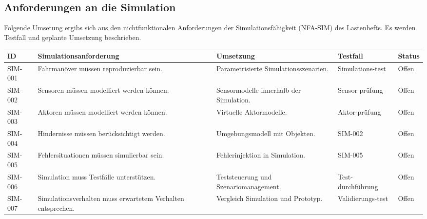 \documentclass[
  a4paper,
  12pt,
  DIV=12,        %
  parskip=half,  %
  headings=small %
]{scrartcl}
\theoremstyle{definition}
\theoremstyle{definition}
\begin{document}
\subsection{Anforderungen an die
Simulation}\label{anforderungen-an-die-simulation}

Folgende Umsetung ergibs sich aus den nichtfunktionalen Anforderungen
der Simulationsfähigkeit (NFA-SIM) des Lastenhefts. Es werden Testfall
und geplante Umsetzung beschrieben.

\begin{longtable}[]{@{}
  >{\raggedright\arraybackslash}p{}
  >{\raggedright\arraybackslash}p{}
  >{\raggedright\arraybackslash}p{}
  >{\raggedright\arraybackslash}p{}
  >{\raggedleft\arraybackslash}p{}@{}}
\toprule\noalign{}
\begin{minipage}[b]{\linewidth}\raggedright
ID
\end{minipage} & \begin{minipage}[b]{\linewidth}\raggedright
Simulationsanforderung
\end{minipage} & \begin{minipage}[b]{\linewidth}\raggedright
Umsetzung
\end{minipage} & \begin{minipage}[b]{\linewidth}\raggedright
Testfall
\end{minipage} & \begin{minipage}[b]{\linewidth}\raggedleft
Status
\end{minipage} \\
\midrule\noalign{}
\endhead
\bottomrule\noalign{}
\endlastfoot
SIM-001 & Fahrmanöver müssen reproduzierbar sein. & Parametrisierte
Simulationsszenarien. & Simulations-test & Offen \\
SIM-002 & Sensoren müssen modelliert werden können. & Sensormodelle
innerhalb der Simulation. & Sensor-prüfung & Offen \\
SIM-003 & Aktoren müssen modelliert werden können. & Virtuelle
Aktormodelle. & Aktor-prüfung & Offen \\
SIM-004 & Hindernisse müssen berücksichtigt werden. & Umgebungsmodell
mit Objekten. & SIM-002 & Offen \\
SIM-005 & Fehlersituationen müssen simulierbar sein. & Fehlerinjektion
in Simulation. & SIM-005 & Offen \\
SIM-006 & Simulation muss Testfälle unterstützen. & Teststeuerung und
Szenariomanagement. & Test-durchführung & Offen \\
SIM-007 & Simulationsverhalten muss erwartetem Verhalten entsprechen. &
Vergleich Simulation und Prototyp. & Validierungs-test & Offen \\
\end{longtable}
\end{document}
